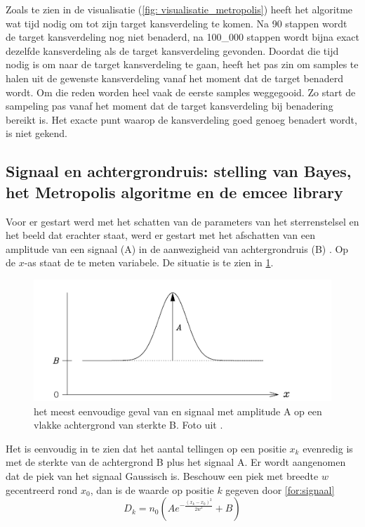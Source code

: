 Zoals te zien in de visualisatie (\cref{fig: visualisatie_metropolis}) heeft het algoritme wat tijd nodig om tot zijn target kansverdeling te komen. Na 90 stappen wordt de target kansverdeling nog niet benaderd, na 100\_000 stappen wordt bijna exact dezelfde kansverdeling als de target kansverdeling gevonden. Doordat die tijd nodig is om naar de target kansverdeling te gaan, heeft het pas zin om samples te halen uit de gewenste kansverdeling vanaf het moment dat de target benaderd wordt. Om die reden worden heel vaak de eerste samples weggegooid. Zo start de sampeling pas vanaf het moment dat de target kansverdeling bij benadering bereikt is. Het exacte punt waarop de kansverdeling goed genoeg benadert wordt, is niet gekend.
\subsection{Signaal en achtergrondruis: stelling van Bayes, het Metropolis algoritme en de emcee library}
Voor er gestart werd met het schatten van de parameters van het sterrenstelsel en het beeld dat erachter staat, werd er gestart met het afschatten van een amplitude van een signaal (A) in de aanwezigheid van achtergrondruis (B) \cite{sivia-2006}. Op de $x$-as staat de te meten variabele. De situatie is te zien in \cref{fig:AB}. 
\begin{figure}
    \centering
    \includegraphics[width=0.95\linewidth]{Figures/Schermafbeelding 2024-05-13 144419.png}
    \caption{het meest eenvoudige geval van en signaal met amplitude A op een vlakke achtergrond van sterkte B. Foto uit \cite{sivia-2006}.}
    \label{fig:AB}
\end{figure}
Het is eenvoudig in te zien dat het aantal tellingen op een positie $x_{k}$ evenredig is met de sterkte van de achtergrond B plus het signaal A. Er wordt aangenomen dat de piek van het signaal Gaussisch is. Beschouw een piek met breedte $w$ gecentreerd rond $x_{0}$, dan is de waarde op positie $k$ gegeven door \cref{for:signaal}
\begin{equation}
D_{k}=n_{0}\left(Ae^{-\frac{(x_{k}-x_{0})^{2}}{2w^{2}}} + B\right)
\label{for:signaal}
\end{equation}

